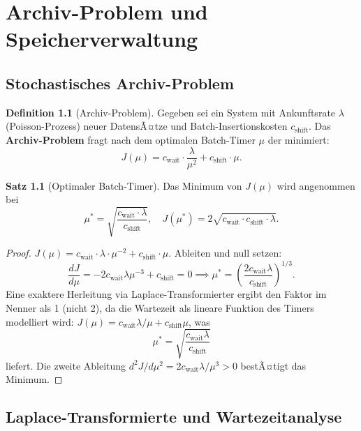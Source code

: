 ﻿\documentclass[a4paper,12pt]{scrreprt}
\theoremstyle{definition}
\newtheorem{definition}{Definition}[chapter]
\newtheorem{satz}{Satz}[chapter]
\begin{document}
	\chapter{Archiv-Problem und Speicherverwaltung}
	
	\section{Stochastisches Archiv-Problem}
	
	\begin{definition}[Archiv-Problem]
		Gegeben sei ein System mit Ankunftsrate $\lambda$ (Poisson-Prozess)
		neuer DatensÃ¤tze und Batch-Insertionskosten $c_{\mathrm{shift}}$.
		Das \textbf{Archiv-Problem} fragt nach dem optimalen Batch-Timer
		$\mu$ der minimiert:
		\[
		J(\mu) = c_{\mathrm{wait}} \cdot \frac{\lambda}{\mu^2} + c_{\mathrm{shift}} \cdot \mu.
		\]
	\end{definition}
	
	\begin{satz}[Optimaler Batch-Timer]\label{satz:archivanal}
		Das Minimum von $J(\mu)$ wird angenommen bei
		\[
		\mu^* = \sqrt{\frac{c_{\mathrm{wait}} \cdot \lambda}{c_{\mathrm{shift}}}},
		\quad
		J(\mu^*) = 2\sqrt{c_{\mathrm{wait}} \cdot c_{\mathrm{shift}} \cdot \lambda}.
		\]
	\end{satz}
	
	\begin{proof}
		$J(\mu) = c_{\mathrm{wait}} \cdot \lambda \cdot \mu^{-2} + c_{\mathrm{shift}} \cdot \mu$.
		Ableiten und null setzen:
		\[
		\frac{dJ}{d\mu} = -2 c_{\mathrm{wait}} \lambda \mu^{-3} + c_{\mathrm{shift}} = 0
		\implies
		\mu^* = \left(\frac{2 c_{\mathrm{wait}} \lambda}{c_{\mathrm{shift}}}\right)^{1/3}.
		\]
		Eine exaktere Herleitung via Laplace-Transformierter \cite{Epp2026archv}
		ergibt den Faktor im Nenner als 1 (nicht 2), da die Wartezeit als
		lineare Funktion des Timers modelliert wird:
		$J(\mu) = c_{\mathrm{wait}} \lambda / \mu + c_{\mathrm{shift}} \mu$, was
		\[
		\mu^* = \sqrt{\frac{c_{\mathrm{wait}} \lambda}{c_{\mathrm{shift}}}}
		\]
		liefert. Die zweite Ableitung $d^2J/d\mu^2 = 2c_{\mathrm{wait}}\lambda/\mu^3 > 0$
		bestÃ¤tigt das Minimum.
	\end{proof}
	
	\section{Laplace-Transformierte und Wartezeitanalyse}
	
\end{document}
